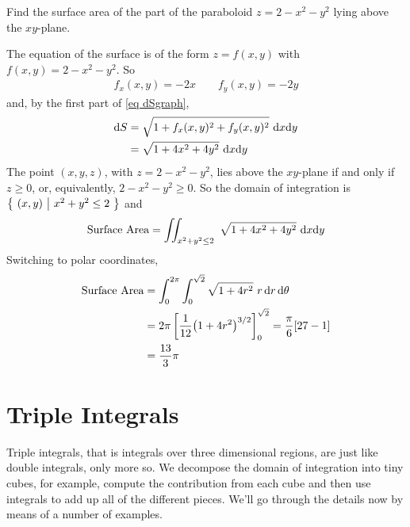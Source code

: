 \begin{eg}\label{eg area paraboloid}
Find the surface area of the part of the paraboloid $z=2-x^2-y^2$
lying above the $xy$-plane. 

\soln
The equation of the surface is of the form $z=f(x,y)$ with $f(x,y)=2-x^2-y^2$.
So 
\begin{align*}
f_x(x,y) =-2x\qquad
f_y(x,y) =-2y
\end{align*}
and, by the first part of \eqref{eq dSgraph},
\begin{align*}
\mathrm{d}S &= \sqrt{1 + f_x(x,y)^2 + f_y(x,y)^2}\  \mathrm{d}x\mathrm{d}y \\
   &=\sqrt{1+4x^2+4y^2} \ \mathrm{d}x\mathrm{d}y 
\end{align*}
The point $(x,y,z)$, with $z=2-x^2-y^2$, lies above the $xy$-plane if and only 
if $z\ge 0$, or, equivalently, $2-x^2-y^2\ge 0$. So the domain of 
integration is $\big\{ \ (x,y)\ \big|\ x^2+y^2\le 2\ \big\}$ and
\begin{equation*}
\text{Surface Area} = \dblInt_{x^2+y^2\le 2}\ \sqrt{1+4x^2+4y^2} \ \dee{x}\dee{y}
\end{equation*}
Switching to polar coordinates,
\begin{align*}
\text{Surface Area} 
&=\int_0^{2\pi}\int_0^{\sqrt{2}}\sqrt{1+4r^2}\  r\,\mathrm{d}r\, \mathrm{d}\theta\\
&=2\pi\left[\frac{1}{12}{\big(1+4r^2\big)}^{3/2}\right]_0^{\sqrt{2}}
=\frac{\pi}{6}[27-1] \\
&=\frac{13}{3}\pi
\end{align*}
\end{eg}


\section{Triple Integrals}\label{sec 3d integrals}
Triple integrals, that is integrals over three dimensional regions,
are just like double integrals, only more so. We decompose the
domain of integration into tiny cubes, for example,
compute the contribution from each cube and then use integrals
to add up all of the different pieces. We'll go through the
details now by means of a number of examples.


